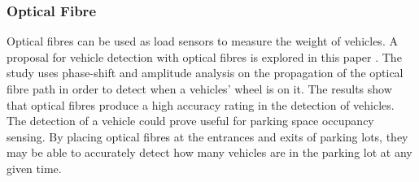 \subsubsection*{Optical Fibre}
Optical fibres can be used as load sensors to measure the weight of vehicles. A proposal for vehicle detection with optical fibres is explored in this paper \citep{gupta_automated_2016}. The study uses phase-shift and amplitude analysis on the propagation of the optical fibre path in order to detect when a vehicles' wheel is on it. The results show that optical fibres produce a high accuracy rating in the detection of vehicles. The detection of a vehicle could prove useful for parking space occupancy sensing. By placing optical fibres at the entrances and exits of parking lots, they may be able to accurately detect how many vehicles are in the parking lot at any given time.